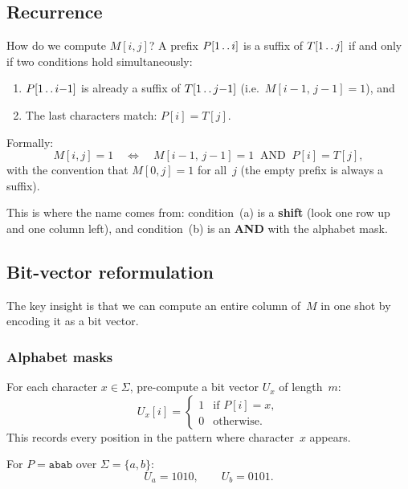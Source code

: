 \subsection{Recurrence}

How do we compute $M[i,j]$?  A prefix $P[1 \mathinner{.\,.} i]$ is a suffix of
$T[1 \mathinner{.\,.} j]$ if and only if two conditions hold simultaneously:

\begin{enumerate}[nosep]
  \item $P[1 \mathinner{.\,.} i{-}1]$ is already a suffix of
        $T[1 \mathinner{.\,.} j{-}1]$
        (i.e.\ $M[i{-}1,\, j{-}1] = 1$), and
  \item The last characters match: $P[i] = T[j]$.
\end{enumerate}

Formally:
\[
  M[i,j] = 1
  \quad\iff\quad
  M[i{-}1,\, j{-}1] = 1
  \;\;\text{AND}\;\;
  P[i] = T[j],
\]
with the convention that $M[0, j] = 1$ for all~$j$ (the empty prefix is always
a suffix).

This is where the name comes from: condition~(a) is a \textbf{shift} (look one
row up and one column left), and condition~(b) is an \textbf{AND} with the
alphabet mask.

\subsection{Bit-vector reformulation}

The key insight is that we can compute an entire column of~$M$ in one shot by
encoding it as a bit vector.

\subsubsection*{Alphabet masks}

For each character $x \in \Sigma$, pre-compute a bit vector $U_x$ of length~$m$:
\[
  U_x[i] =
  \begin{cases}
    1 & \text{if } P[i] = x,\\
    0 & \text{otherwise.}
  \end{cases}
\]
This records every position in the pattern where character~$x$ appears.

\begin{example}
  For $P = \texttt{abab}$ over $\Sigma = \{a,b\}$:
  \[
    U_a = 1010, \qquad U_b = 0101.
  \]
\end{example}

